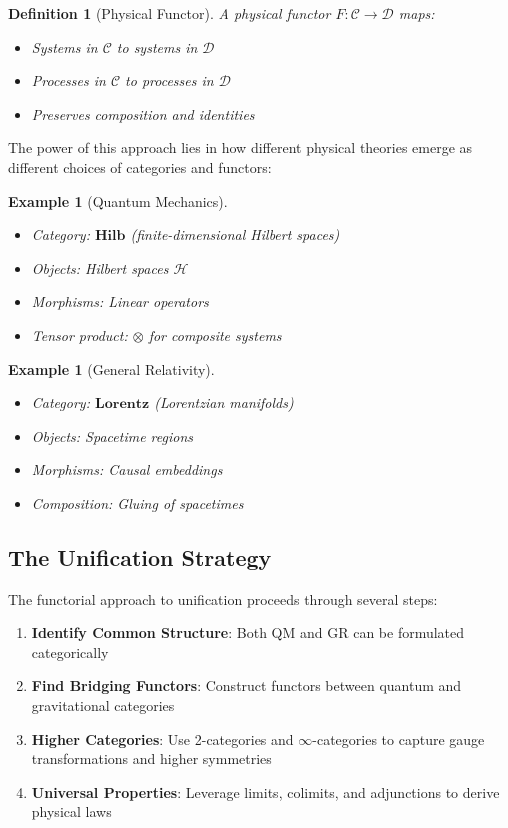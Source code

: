 \documentclass[11pt,a4paper]{article}
\newtheorem{definition}[theorem]{Definition}
\newtheorem{example}[theorem]{Example}
\newcommand{\Hilb}{\mathbf{Hilb}}
\begin{document}
\begin{definition}[Physical Functor]
A \emph{physical functor} $F: \mathcal{C} \to \mathcal{D}$ maps:
\begin{itemize}
    \item Systems in $\mathcal{C}$ to systems in $\mathcal{D}$
    \item Processes in $\mathcal{C}$ to processes in $\mathcal{D}$
    \item Preserves composition and identities
\end{itemize}
\end{definition}

The power of this approach lies in how different physical theories emerge as different choices of categories and functors:

\begin{example}[Quantum Mechanics]
\begin{itemize}
    \item Category: $\Hilb$ (finite-dimensional Hilbert spaces)
    \item Objects: Hilbert spaces $\mathcal{H}$
    \item Morphisms: Linear operators
    \item Tensor product: $\otimes$ for composite systems
\end{itemize}
\end{example}

\begin{example}[General Relativity]
\begin{itemize}
    \item Category: $\mathbf{Lorentz}$ (Lorentzian manifolds)
    \item Objects: Spacetime regions
    \item Morphisms: Causal embeddings
    \item Composition: Gluing of spacetimes
\end{itemize}
\end{example}

\subsection{The Unification Strategy}

The functorial approach to unification proceeds through several steps:

\begin{enumerate}
    \item \textbf{Identify Common Structure}: Both QM and GR can be formulated categorically
    \item \textbf{Find Bridging Functors}: Construct functors between quantum and gravitational categories
    \item \textbf{Higher Categories}: Use 2-categories and $\infty$-categories to capture gauge transformations and higher symmetries
    \item \textbf{Universal Properties}: Leverage limits, colimits, and adjunctions to derive physical laws
\end{enumerate}
\end{document}
